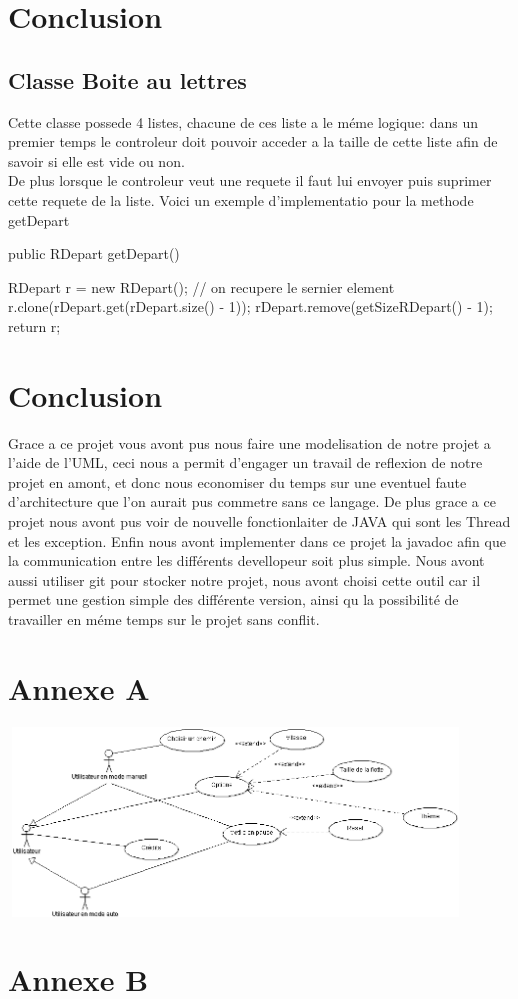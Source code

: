 \documentclass[a4paper, titlepage]{report}
\begin{document}
\chapter*{Conclusion}



\section{Classe Boite au lettres}
Cette classe possede 4 listes, chacune de ces liste a le méme logique: dans un premier temps le controleur doit pouvoir acceder a la taille de cette liste afin de savoir si elle est vide ou non.
\\
De plus  lorsque le controleur veut une requete il faut lui envoyer puis suprimer cette requete de la liste. Voici un exemple d'implementatio pour la methode getDepart


public RDepart getDepart() {
		RDepart r = new RDepart();
		// on recupere le sernier element
		r.clone(rDepart.get(rDepart.size() - 1));
		rDepart.remove(getSizeRDepart() - 1);
		return r;

	}


\chapter*{Conclusion}
Grace a ce projet vous avont pus nous faire une modelisation de notre projet a l'aide de l'UML, ceci nous a permit d'engager un travail de reflexion de notre projet en amont, et donc nous economiser du temps sur une eventuel faute d'architecture que l'on aurait pus commetre sans ce langage. De plus grace a ce projet nous avont pus voir de nouvelle fonctionlaiter de JAVA qui sont les Thread et les exception. Enfin nous avont implementer dans ce projet la javadoc afin que la communication entre les différents devellopeur soit plus simple. Nous avont aussi utiliser git pour stocker notre projet, nous avont choisi cette outil car il permet une gestion simple des différente version, ainsi qu la possibilité de travailler en méme temps sur le projet sans conflit.
\appendix
\chapter*{Annexe A}
\includegraphics[width=455px, height=190px]{Images/CasUtilisation.PNG}
\chapter*{Annexe B}
\end{document}
